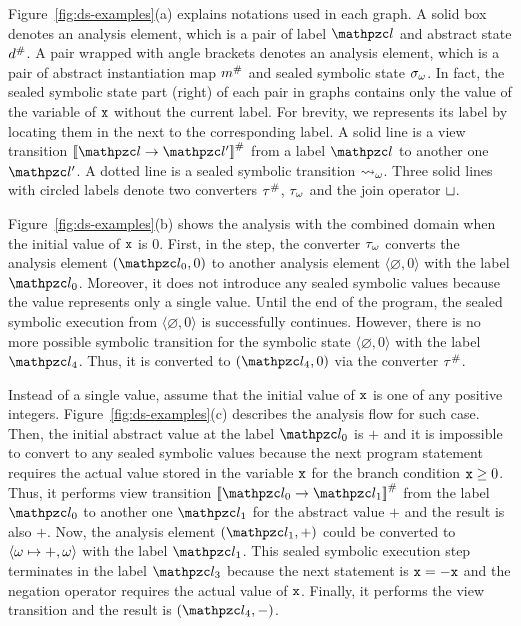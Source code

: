 Figure~\ref{fig:ds-examples}(a) explains notations used in each graph. A solid
box denotes an analysis element, which is a pair of label $\lab$ and abstract
state ${d}^{\#}$.  A pair wrapped with angle brackets denotes an analysis
element, which is a pair of abstract instantiation map ${m}^{\#}$ and sealed
symbolic state ${\sigma}_\omega$.  In fact, the sealed symbolic state part (right) of
each pair in graphs contains only the value of the variable of $\texttt{x}$ without
the current label.  For brevity, we represents its label by locating them in the
next to the corresponding label.  A solid line is a view transition
$\viewtrans{\lab}{\lab'}$ from a label $\lab$ to another one $\lab'$.  A dotted
line is a sealed symbolic transition ${\leadsto}_\omega$.  Three solid lines with
circled labels denote two converters ${\tau}^{\#}$, ${\tau}_\omega$ and the join
operator $\sqcup$.

Figure~\ref{fig:ds-examples}(b) shows the analysis with the combined domain when
the initial value of $\texttt{x}$ is $0$.  First, in the \triagename step,
the converter ${\tau}_\omega$ converts the analysis element $(\lab_0, 0)$ to
another analysis element $\langle \varnothing, 0 \rangle$ with the label
$\lab_0$.  Moreover, it does not introduce any sealed symbolic values because
the value represents only a single value.  Until the end of the program, the
sealed symbolic execution from $\langle \varnothing, 0 \rangle$ is successfully
continues.  However, there is no more possible symbolic transition for the
symbolic state $\langle \varnothing, 0 \rangle$ with the label $\lab_4$.  Thus,
it is converted to $(\lab_4, 0)$ via the converter ${\tau}^{\#}$.

Instead of a single value, assume that the initial value of $\texttt{x}$ is one of
any positive integers.  Figure~\ref{fig:ds-examples}(c) describes the analysis
flow for such case.  Then, the initial abstract value at the label $\lab_0$ is
$+$ and it is impossible to convert to any sealed symbolic values because the
next program statement requires the actual value stored in the variable $\texttt{x}$
for the branch condition $\texttt{x} \geq 0$.  Thus, it performs view transition
$\viewtrans{\lab_0}{\lab_1}$ from the label $\lab_0$ to another one $\lab_1$ for
the abstract value $+$ and the result is also $+$.  Now, the analysis element
$(\lab_1, +)$ could be converted to $\langle \omega \mapsto +, \omega \rangle$
with the label $\lab_1$.  This sealed symbolic execution step terminates in the
label $\lab_3$ because the next statement is $\texttt{x} = -\texttt{x}$ and the negation
operator requires the actual value of $\texttt{x}$.  Finally, it performs the view
transition and the result is $(\lab_4, -)$.

